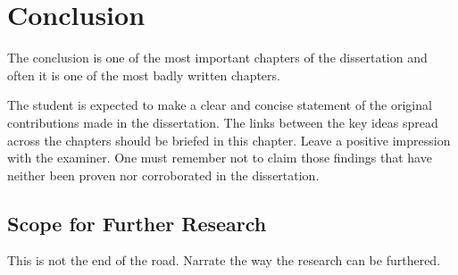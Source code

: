 \chapter{Conclusion}\label{Conclusion}
The conclusion is one of the most important chapters of the dissertation and often it is one of the most badly written chapters.

\par The student is expected to make a clear and concise statement of the original contributions made in the dissertation. The links between the key ideas spread across the chapters should be briefed in this chapter. Leave a positive impression with the examiner. One must remember not to claim those findings that have neither been proven nor corroborated in the dissertation.
\par \section*{Scope for Further Research}
This is not the end of the road. Narrate the way the research can be furthered.
